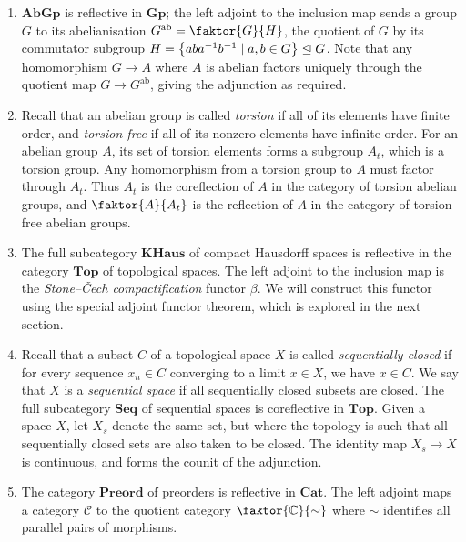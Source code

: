\begin{example}
    \begin{enumerate}
        \item \( \mathbf{AbGp} \) is reflective in \( \mathbf{Gp} \); the left adjoint to the inclusion map sends a group \( G \) to its abelianisation \( G^{\mathrm{ab}} = \faktor{G}{H} \), the quotient of \( G \) by its commutator subgroup \( H = \qty{aba^{-1}b^{-1} \mid a, b \in G} \trianglelefteq G \).
        Note that any homomorphism \( G \to A \) where \( A \) is abelian factors uniquely through the quotient map \( G \to G^{\mathrm{ab}} \), giving the adjunction as required.
        \item Recall that an abelian group is called \emph{torsion} if all of its elements have finite order, and \emph{torsion-free} if all of its nonzero elements have infinite order.
        For an abelian group \( A \), its set of torsion elements forms a subgroup \( A_t \), which is a torsion group.
        Any homomorphism from a torsion group to \( A \) must factor through \( A_t \).
        Thus \( A_t \) is the coreflection of \( A \) in the category of torsion abelian groups, and \( \faktor{A}{A_t} \) is the reflection of \( A \) in the category of torsion-free abelian groups.
        \item The full subcategory \( \mathbf{KHaus} \) of compact Hausdorff spaces is reflective in the category \( \mathbf{Top} \) of topological spaces.
        The left adjoint to the inclusion map is the \emph{Stone--\v{C}ech compactification} functor \( \beta \).
        We will construct this functor using the special adjoint functor theorem, which is explored in the next section.
        \item Recall that a subset \( C \) of a topological space \( X \) is called \emph{sequentially closed} if for every sequence \( x_n \in C \) converging to a limit \( x \in X \), we have \( x \in C \).
        We say that \( X \) is a \emph{sequential space} if all sequentially closed subsets are closed.
        The full subcategory \( \mathbf{Seq} \) of sequential spaces is coreflective in \( \mathbf{Top} \).
        Given a space \( X \), let \( X_s \) denote the same set, but where the topology is such that all sequentially closed sets are also taken to be closed.
        The identity map \( X_s \to X \) is continuous, and forms the counit of the adjunction.
        \item The category \( \mathbf{Preord} \) of preorders is reflective in \( \mathbf{Cat} \).
        The left adjoint maps a category \( \mathcal C \) to the quotient category \( \faktor{\mathbb C}{\sim} \) where \( \sim \) identifies all parallel pairs of morphisms.

\end{enumerate}
\end{example}
